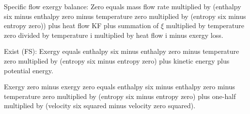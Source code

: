 Specific flow exergy balance:  
Zero equals mass flow rate multiplied by (enthalpy six minus enthalpy zero minus temperature zero multiplied by (entropy six minus entropy zero)) plus heat flow KF plus summation of \( \xi \) multiplied by temperature zero divided by temperature i multiplied by heat flow i minus exergy loss.  

Exist (FS):  
Exergy equals enthalpy six minus enthalpy zero minus temperature zero multiplied by (entropy six minus entropy zero) plus kinetic energy plus potential energy.  

Exergy zero minus exergy zero equals enthalpy six minus enthalpy zero minus temperature zero multiplied by (entropy six minus entropy zero) plus one-half multiplied by (velocity six squared minus velocity zero squared).